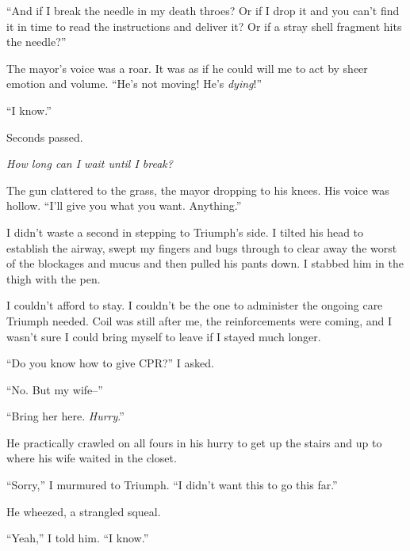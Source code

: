 ``And if I break the needle in my death throes?  Or if I drop it and you can't find it in time to read the instructions and deliver it?  Or if a stray shell fragment hits the needle?''



The mayor's voice was a roar.  It was as if he could will me to act by sheer emotion and volume.  ``He's not moving!  He's \emph{dying}!''



``I know.''



Seconds passed.



\emph{How long can I wait until I break?}



The gun clattered to the grass, the mayor dropping to his knees.  His voice was hollow.  ``I'll give you what you want.  Anything.''



I didn't waste a second in stepping to Triumph's side.  I tilted his head to establish the airway, swept my fingers and bugs through to clear away the worst of the blockages and mucus and then pulled his pants down.  I stabbed him in the thigh with the pen.



I couldn't afford to stay.  I couldn't be the one to administer the ongoing care Triumph needed.  Coil was still after me, the reinforcements were coming, and I wasn't sure I could bring myself to leave if I stayed much longer.



``Do you know how to give CPR?'' I asked.



``No.  But my wife--''



``Bring her here.  \emph{Hurry}.''



He practically crawled on all fours in his hurry to get up the stairs and up to where his wife waited in the closet.



``Sorry,'' I murmured to Triumph.  ``I didn't want this to go this far.''



He wheezed, a strangled squeal.



``Yeah,'' I told him.  ``I know.''




